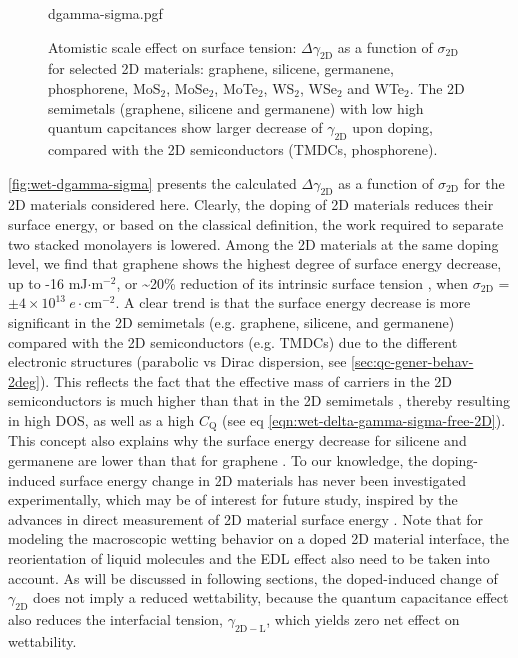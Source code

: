 \begin{figure}[!htbp]
  \centering
  {dgamma-sigma.pgf}
\caption{\label{fig:wet-dgamma-sigma} Atomistic scale effect on surface tension:
  \(\Delta \gamma_{\mathrm{2D}}\) as a function of
  \(\sigma_{\mathrm{2D}}\) for selected 2D materials: graphene,
  silicene, germanene, phosphorene, MoS\(_{2}\), MoSe\(_{2}\),
  MoTe\(_{2}\), WS\(_{2}\), WSe\(_{2}\) and WTe\(_{2}\). The 2D
  semimetals (graphene, silicene and germanene) with low high quantum
  capcitances show larger decrease of \(\gamma_{\mathrm{2D}}\) upon
  doping, compared with the 2D semiconductors (TMDCs, phosphorene).}
\end{figure}

\autoref{fig:wet-dgamma-sigma} presents the calculated
\(\Delta \gamma_{\mathrm{2D}}\) as a function of
\(\sigma_{\mathrm{2D}}\) for the 2D materials considered
here.
%
Clearly, the doping of 2D materials reduces their surface
energy, or based on the classical definition, the work required to
separate two stacked monolayers is lowered.
%
Among the 2D materials at
the same doping level, we find that graphene shows the highest degree
of surface energy decrease, up to -16 mJ\(\cdot \mathrm{m}^{-2}\), or
\textasciitilde{}20\% reduction of its intrinsic surface tension
\autocite{shih_2013_wetting_natmat}, when \(\sigma_{\mathrm{2D}}\) =
\(\pm 4\times10^{13}\ e\cdot \mathrm{cm}^{-2}\).
%
A clear trend is that the surface energy decrease is more significant
in the 2D semimetals (e.g. graphene, silicene, and germanene) compared
with the 2D semiconductors (e.g. TMDCs) due to the different
electronic structures (parabolic vs Dirac dispersion, see
\autoref{sec:qc-gener-behav-2deg}).
%
This reflects the fact that the effective mass of carriers in the 2D
semiconductors is much higher than that in the 2D semimetals
\autocite{Davies_1997_book}, thereby resulting in high DOS, as well as a
high \(C_{\mathrm{Q}}\) (see eq
\autoref{eqn:wet-delta-gamma-sigma-free-2D}). This concept also
explains why the surface energy decrease for silicene and germanene
are lower than that for graphene \autocite{Yan_2013_e-hv-couple}.  To our
knowledge, the doping-induced surface energy change in 2D materials
has never been investigated experimentally, which may be of interest
for future study, inspired by the advances in direct measurement of 2D
material surface energy \autocite{van_Engers_2017_direct_surf_gr}. Note
that for modeling the macroscopic wetting behavior on a doped 2D
material interface, the reorientation of liquid molecules and the EDL
effect also need to be taken into account.
%
As will be discussed
in following sections, the doped-induced change of \(\gamma_{\mathrm{2D}}\) does not
imply a reduced wettability, because the quantum capacitance effect
also reduces the interfacial tension, \(\gamma_{\mathrm{2D-L}}\),
which yields zero net effect on wettability.

